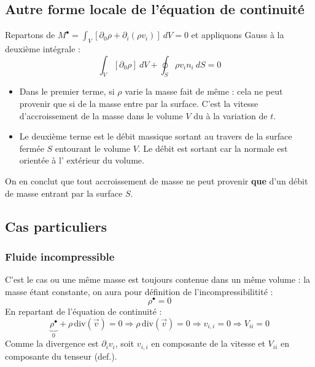 \subsection{Autre forme locale de l'équation de continuité}
Repartons de $M^\bullet = \int_V [\partial_0\rho + \partial_i(\rho v_i)]\ dV = 0$ et 
appliquons Gauss à la deuxième intégrale :
\begin{equation}
\int_V [\partial_0\rho]\ dV + \oint_S \rho v_in_i\ dS = 0
\end{equation}
\begin{itemize}
\item Dans le premier terme, si $\rho$ varie la masse fait de même : cela ne peut 
provenir que si de la masse entre par la surface. C'est la vitesse d'accroissement de
la masse dans le volume $V$ du à la variation de $t$.
\item Le deuxième terme est le débit massique sortant au travers de la surface fermée 
$S$ entourant le volume $V$. Le débit est sortant car la normale est orientée à l'
extérieur du volume.
\end{itemize}
On en conclut que tout accroissement de masse ne peut provenir \textbf{que} d'un débit
de masse entrant par la surface $S$.


\subsection{Cas particuliers}
    \subsubsection{Fluide incompressible}
    C'est le cas ou une même masse est toujours contenue dans un même volume : la 
    masse étant constante, on aura pour définition de l'incompressibilitité :
    \begin{equation}
    \rho^\bullet = 0
    \end{equation}
    En repartant de l'équation de continuité : 
    \begin{equation}
    \underbrace{\rho^\bullet}_{0} +\rho\,\text{div}(\vec v) = 0 \Rightarrow
    \rho\,\text{div}(\vec v) = 0 \Rightarrow v_{i,i} = 0 \Rightarrow V_{ii} = 0
    \end{equation}
    Comme la divergence est $\partial_i v_i$, soit $v_{i,i}$ en composante de la vitesse et
    $V_{ii}$ en composante du tenseur (def.).
    
    
